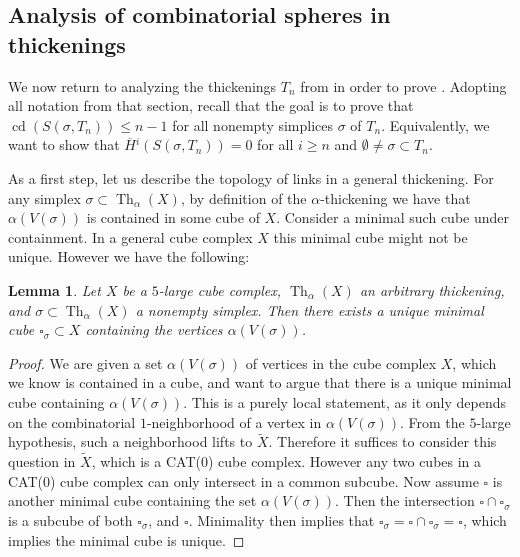 \documentclass[12pt, letterpaper]{article}
\newcommand{\Th}{\operatorname{Th}}
\newcommand{\cd}{\operatorname{cd}}
\theoremstyle{plain}
\newtheorem{lem}[thm]{Lemma}
\theoremstyle{definition}
\begin{document}
\subsection{Analysis of combinatorial spheres in thickenings}\label{subsec:thickenings}

We now return to analyzing the thickenings $T_n$ from  in order to prove . Adopting all notation from that section, recall that the goal is to prove that $\cd(S(\sigma, T_n))\leq n-1$ for all nonempty simplices $\sigma$ of $T_n$. Equivalently, we want to show that $\overline{H}{}^i(S(\sigma, T_n))=0$ for all $i\geq n$ and $\emptyset \neq \sigma \subset T_n$.
    
As a first step, let us describe the topology of links in a general thickening. For any simplex $\sigma \subset \Th_\alpha(X)$, by definition of the $\alpha$-thickening we have that $\alpha(V(\sigma))$ is contained in some cube of $X$. Consider a minimal such cube under containment. In a general cube complex $X$ this minimal cube might not be unique. However we have the following:

\begin{lem}\label{lem:min-cube-unique}
    Let $X$ be a $5$-large cube complex, $\Th_\alpha(X)$ an arbitrary thickening, and $\sigma \subset \Th_\alpha(X)$ a nonempty simplex. Then there exists a unique minimal cube $\square_\sigma \subset X$ containing the vertices $\alpha(V(\sigma))$.
\end{lem}

\begin{proof}
    We are given a set $\alpha(V(\sigma))$ of vertices in the cube complex $X$, which we know is contained in a cube, and want to argue that there is a unique minimal cube containing $\alpha(V(\sigma))$. This is a purely local statement, as it only depends on the combinatorial $1$-neighborhood of a vertex in $\alpha(V(\sigma))$. From the $5$-large hypothesis, such a neighborhood lifts to $\tilde X$. Therefore it suffices to consider this question in $\tilde X$, which is a CAT($0$) cube complex. However any two cubes in a CAT($0$) cube complex can only intersect in a common subcube. Now assume $\square$ is another minimal cube containing the set $\alpha(V(\sigma))$. Then the intersection $\square \cap \square_\sigma$ is a subcube of both $\square_\sigma$, and $\square$. Minimality then implies that $\square_\sigma = \square \cap \square_\sigma = \square$, which implies the minimal cube is unique. 
\end{proof}
\end{document}
